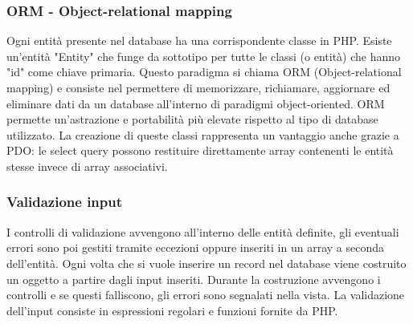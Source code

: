 \subsubsection{ORM - Object-relational mapping}
Ogni entità presente nel database ha una corrispondente classe in PHP. Esiste un'entità "Entity" che funge da sottotipo per tutte le classi (o entità) che hanno "id" come chiave primaria. Questo paradigma si chiama ORM (Object-relational mapping) e consiste nel permettere di memorizzare, richiamare, aggiornare ed eliminare dati da un database all’interno di paradigmi object-oriented. ORM permette un'astrazione e portabilità più elevate rispetto al tipo di database utilizzato. La creazione di queste classi rappresenta un vantaggio anche grazie a PDO: le select query possono restituire direttamente array contenenti le entità stesse invece di array associativi.
\subsubsection{Validazione input}
I controlli di validazione avvengono all'interno delle entità definite, gli eventuali errori sono poi gestiti tramite eccezioni oppure inseriti in un array a seconda dell'entità. Ogni volta che si vuole inserire un record nel database viene costruito un oggetto a partire dagli input inseriti. Durante la costruzione avvengono i controlli e se questi falliscono, gli errori sono segnalati nella vista. La validazione dell'input consiste in espressioni regolari e funzioni fornite da PHP.
